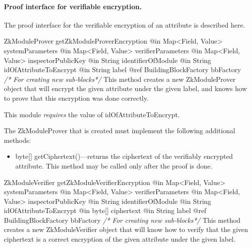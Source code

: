    \paragraph{Proof interface for verifiable encryption.}
    The proof interface for the verifiable encryption of an attribute is described here.
      \begin{method}
      {ZkModuleProver}
      {getZkModuleProverEncryption}
      {
        {@in Map<Field, Value> systemParameters}
        {@in Map<Field, Value> verifierParameters}
        {@in Map<Field, Value> inspectorPublicKey}
        {@in String identifierOfModule}
        {@in String idOfAttributeToEncrypt}
        {@in String label}
        {@ref BuildingBlockFactory bbFactory \textrm{\emph{/* For creating new sub-blocks*/}}}
      }
      This method creates a new ZkModuleProver object that will
      encrypt the given attribute under the given label, and knows how to prove that this
      encryption was done correctly.

      This module \emph{requires} the value of idOfAttributeToEncrypt.

      The ZkModuleProver that is created must implement the following additional methods:
      \begin{itemize}
        \item byte[] getCiphertext()---returns the ciphertext of the verifiably encrypted attribute.
                This method may be called only after the proof is done.
      \end{itemize}

      \end{method}
      \begin{method}
      {ZkModuleVerifier}
      {getZkModuleVerifierEncryption}
      {
        {@in Map<Field, Value> systemParameters}
        {@in Map<Field, Value> verifierParameters}
        {@in Map<Field, Value> inspectorPublicKey}
        {@in String identifierOfModule}
        {@in String idOfAttributeToEncrypt}
        {@in byte[] ciphertext}
        {@in String label}
        {@ref BuildingBlockFactory bbFactory \textrm{\emph{/* For creating new sub-blocks*/}}}
      }
      This method creates a new ZkModuleVerifier object that will know how to verify
      that the given ciphertext is a correct encryption of the given attribute
      under the given label.
      \end{method}

